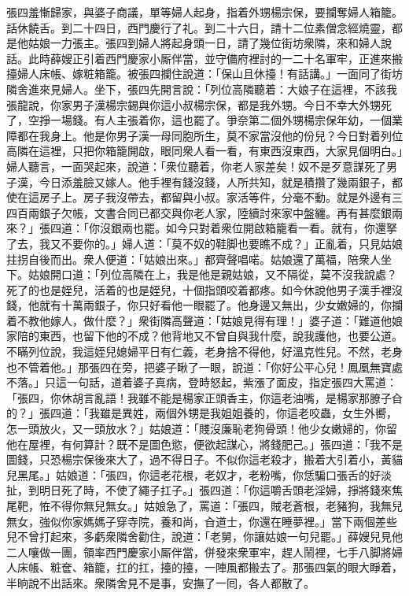 張四羞慚歸家，與婆子商議，{}單等婦人起身，指着外甥楊宗保，要攔奪婦人箱籠。話休饒舌。到二十四日，西門慶行了礼。到二十六日，請十二位素僧念經燒靈，都是他姑娘一力張主。張四到婦人將起身頭一日，請了幾位街坊衆隣，來和婦人說話。此時薛嫂正引着西門慶家小厮伴當，並守備府裡討的一二十名軍牢，正進來搬擡婦人床帳、嫁粧箱籠。被張四攔住說道：「保山且休擡！有話講。」一面同了街坊隣舍進來見婦人。坐下，張四先開言說：「列位高隣聽着：大娘子在這裡，不該我張龍說，{}你家男子漢楊宗錫與你這小叔楊宗保，都是我外甥。今日不幸大外甥死了，空掙一場錢。有人主張着你，{}這也罷了。爭奈第二個外甥楊宗保年幼，一個業障都在我身上。他是你男子漢一母同胞所生，莫不家當沒他的份兒？今日對着列位高隣在這裡，只把你箱籠開啟，眼同衆人看一看，有東西沒東西，大家見個明白。」婦人聽言，一面哭起來，說道：「衆位聽着，你老人家差矣！奴不是歹意謀死了男子漢，今日添羞臉又嫁人。他手裡有錢沒錢，人所共知，就是積攢了幾兩銀子，都使在這房子上。{}房子我沒帶去，都留與小叔。家活等件，分毫不動。就是外邊有三四百兩銀子欠帳，文書合同已都交與你老人家，陸續討來家中盤纏。再有甚麼銀兩來？」張四道：「你沒銀兩也罷。如今只對着衆位開啟箱籠看一看。就有，你還拏了去，我又不要你的。」婦人道：「莫不奴的鞋脚也要瞧不成？」正亂着，只見姑娘拄拐自後而出。{}衆人便道：「姑娘出來。」都齊聲唱喏。姑娘還了萬福，陪衆人坐下。姑娘開口道：「列位高隣在上，我是他是親姑娘，又不隔從，莫不沒我說處？死了的也是姪兒，活着的也是姪兒，十個指頭咬着都疼。如今休說他男子漢手裡沒錢，他就有十萬兩銀子，你只好看他一眼罷了。他身邊又無出，少女嫩婦的，你攔着不教他嫁人，做什麼？」衆街隣高聲道：「姑娘見得有理！」婆子道：「難道他娘家陪的東西，也留下他的不成？他背地又不曾自與我什麼，{}說我護他，也要公道。不瞞列位說，我這姪兒媳婦平日有仁義，老身捨不得他，好溫克性兒。不然，老身也不管着他。」那張四在旁，把婆子瞅了一眼，{}說道：「你好公平心兒！鳳凰無寶處不落。」只這一句話，道着婆子真病，登時怒起，紫漲了面皮，指定張四大罵道：「張四，你休胡言亂語！我雖不能是楊家正頭香主，你這老油嘴，是楊家那膫子㒲的？」{}張四道：「我雖是異姓，兩個外甥是我姐姐養的，你這老咬蟲，女生外嚮，怎一頭放火，又一頭放水？」姑娘道：「賤沒廉恥老狗骨頭！他少女嫩婦的，你留他在屋裡，有何算計？既不是圖色慾，便欲起謀心，將錢肥己。」張四道：「我不是圖錢，只恐楊宗保後來大了，過不得日子。不似你這老殺才，搬着大引着小，黃貓兒黑尾。」姑娘道：「張四，你這老花根，老奴才，老粉嘴，你恁騙口張舌的好淡扯，到明日死了時，不使了繩子扛子。」張四道：「你這嚼舌頭老淫婦，掙將錢來焦尾靶，恠不得你無兒無女。」姑娘急了，罵道：「張四，賊老蒼根，老豬狗，我無兒無女，強似你家媽媽子穿寺院，養和尚，㒲道士，你還在睡夢裡。」當下兩個差些兒不曾打起來，多虧衆隣舍勸住，說道：「老舅，你讓姑娘一句兒罷。」薛嫂兒見他二人嚷做一團，領率西門慶家小厮伴當，併發來衆軍牢，趕人鬧裡，七手八脚將婦人床帳、粧奩、箱籠，扛的扛，擡的擡，一陣風都搬去了。{}那張四氣的眼大睜着，半晌說不出話來。衆隣舍見不是事，安撫了一囘，各人都散了。

